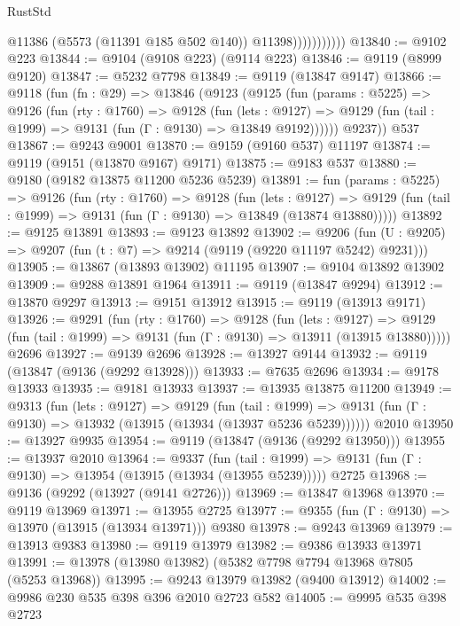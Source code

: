 \begin{lexlean}{RustStd}
\begin{coremodule}
                          @11386
                          (@5573 (@11391 @185 @502 @140))
                          @11398)))))))))))
@13840 := @9102 @223
@13844 := @9104 (@9108 @223) (@9114 @223)
@13846 := @9119 (@8999 @9120)
@13847 := @5232 @7798
@13849 := @9119 (@13847 @9147)
@13866 := @9118
    (fun (fn : @29) =>
    @13846
      (@9123
        (@9125
          (fun (params : @5225) =>
          @9126
            (fun (rty : @1760) =>
            @9128
              (fun (lets : @9127) =>
              @9129 (fun (tail : @1999) => @9131 (fun (Γ : @9130) => @13849 @9192))))))
        @9237))
    @537
@13867 := @9243 @9001
@13870 := @9159 (@9160 @537) @11197
@13874 := @9119 (@9151 (@13870 @9167) @9171)
@13875 := @9183 @537
@13880 := @9180 (@9182 @13875 @11200 @5236 @5239)
@13891 := fun (params : @5225) =>
  @9126
    (fun (rty : @1760) =>
    @9128
      (fun (lets : @9127) =>
      @9129 (fun (tail : @1999) => @9131 (fun (Γ : @9130) => @13849 (@13874 @13880)))))
@13892 := @9125 @13891
@13893 := @9123 @13892
@13902 := @9206
    (fun (U : @9205) => @9207 (fun (t : @7) => @9214 (@9119 (@9220 @11197 @5242) @9231)))
@13905 := @13867 (@13893 @13902) @11195
@13907 := @9104 @13892 @13902
@13909 := @9288 @13891 @1964
@13911 := @9119 (@13847 @9294)
@13912 := @13870 @9297
@13913 := @9151 @13912
@13915 := @9119 (@13913 @9171)
@13926 := @9291
    (fun (rty : @1760) =>
    @9128
      (fun (lets : @9127) =>
      @9129 (fun (tail : @1999) => @9131 (fun (Γ : @9130) => @13911 (@13915 @13880)))))
    @2696
@13927 := @9139 @2696
@13928 := @13927 @9144
@13932 := @9119 (@13847 (@9136 (@9292 @13928)))
@13933 := @7635 @2696
@13934 := @9178 @13933
@13935 := @9181 @13933
@13937 := @13935 @13875 @11200
@13949 := @9313
    (fun (lets : @9127) =>
    @9129
      (fun (tail : @1999) =>
      @9131 (fun (Γ : @9130) => @13932 (@13915 (@13934 (@13937 @5236 @5239))))))
    @2010
@13950 := @13927 @9935
@13954 := @9119 (@13847 (@9136 (@9292 @13950)))
@13955 := @13937 @2010
@13964 := @9337
    (fun (tail : @1999) => @9131 (fun (Γ : @9130) => @13954 (@13915 (@13934 (@13955 @5239)))))
    @2725
@13968 := @9136 (@9292 (@13927 (@9141 @2726)))
@13969 := @13847 @13968
@13970 := @9119 @13969
@13971 := @13955 @2725
@13977 := @9355 (fun (Γ : @9130) => @13970 (@13915 (@13934 @13971))) @9380
@13978 := @9243 @13969
@13979 := @13913 @9383
@13980 := @9119 @13979
@13982 := @9386 @13933 @13971
@13991 := @13978 (@13980 @13982) (@5382 @7798 @7794 @13968 @7805 (@5253 @13968))
@13995 := @9243 @13979 @13982 (@9400 @13912)
@14002 := @9986 @230 @535 @398 @396 @2010 @2723 @582
@14005 := @9995 @535 @398 @2723

\end{coremodule}
\end{lexlean}
